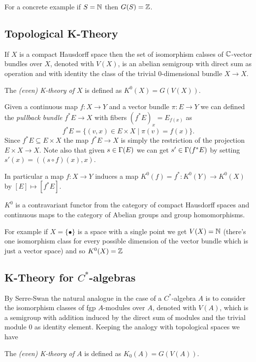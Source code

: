 \noindent For a concrete example if $S=\mathbb{N}$ then $G(S)=\mathbb{Z}$.

\subsection{Topological K-Theory}
If $X$ is a compact Hausdorff space then the set of isomorphism calsses of $\mathbb{C}$-vector bundles over $X$, denoted with $V(X)$, is an abelian semigroup with direct sum as operation and with identity the class of the trivial $0$-dimensional bundle $X\to X$.

\begin{definition}
 The \emph{(even) K-theory of $X$} is defined as $K^0(X)=G(V(X))$.
\end{definition}
\begin{definition}
 Given a continuous map $f\colon X\to Y$ and a vector bundle $\pi\colon E\to Y$ we can defined the \emph{pullback bundle} $f^\ast E\to X$ with fibers $(f^\ast E)_x=E_{f(x)}$ as $$f^\ast E=\{(v,x)\in E\times X\mid \pi(v)=f(x)\}.$$
\noindent Since $f^\ast E\subseteq E\times X$ the map $f^\ast E\to X$ is simply the restriction of the projection $E\times X\to X$. Note also that given $s\in\Gamma(E)$ we can get $s'\in\Gamma(f^\ast E)$ by setting $s'(x)=((s\circ f)(x),x)$.
 
\noindent In particular a map $f\colon X\to Y$ induces a map $K^0(f)=f^\ast\colon K^0(Y)\to K^0(X)$ by $[E]\mapsto [f^\ast E]$.
\end{definition}
\begin{fact}
 $K^0$ is a contravariant functor from the category of compact Hausdorff spaces and continuous maps to the category of Abelian groups and group homomorphisms.
\end{fact}

\noindent For example if $X=\{\bullet\}$ is a space with a single point we get $V(X)=\mathbb{N}$ (there's one isomorphism class for every possible dimension of the vector bundle which is just a vector space) and so $K^0(X)=\mathbb{Z}$

\subsection{K-Theory for $C^\ast$-algebras}
By Serre-Swan the natural analogue in the case of a $C^\ast$-algebra $A$ is to consider the isomorphism classes of fgp $A$-modules over $A$, denoted with $V(A)$, which is a semigroup with addition induced by the direct sum of modules and the trivial module $0$ as identity element. Keeping the analogy with topological spaces we have
\begin{definition}
 The \emph{(even) K-theory of $A$} is defined as $K_0(A)=G(V(A))$. 
\end{definition}

